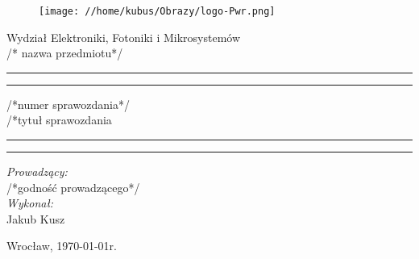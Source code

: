 \begin{titlepage}
\begin{figure}
	\centering
	\texttt{[image: //home/kubus/Obrazy/logo-Pwr.png]}
	
	\label{fig:pwr}
\end{figure}
	\begin{center}
		\huge Wydział Elektroniki, Fotoniki i Mikrosystemów \\ 
		\vspace{40pt}
		\huge /* nazwa przedmiotu*/  \\
	\end{center}
	\vspace{60pt}
	\hrule
	\vspace{1pt}
	\hrule
	\begin{center}
		{\fontsize{40}{50}\selectfont /*numer sprawozdania*/\\ }
		\vspace{10pt}
		{\fontsize{25}{25}\selectfont /*tytuł sprawozdania  }
	\end{center}
	\hrule
	\vspace{1pt}
	\hrule
	\begin{flushright}
		\vspace{65pt}
		\textit{\Large Prowadzący:}\\
		
		\Large /*godność prowadzącego*/\\
		\vspace{10pt}
		\textit{\Large Wykonał:}\\
		
		\Large Jakub Kusz \\
	
	\end{flushright}
	\vspace{100pt}
	\begin{center}
		\large Wrocław, \today r.
	\end{center}
\end{titlepage}

